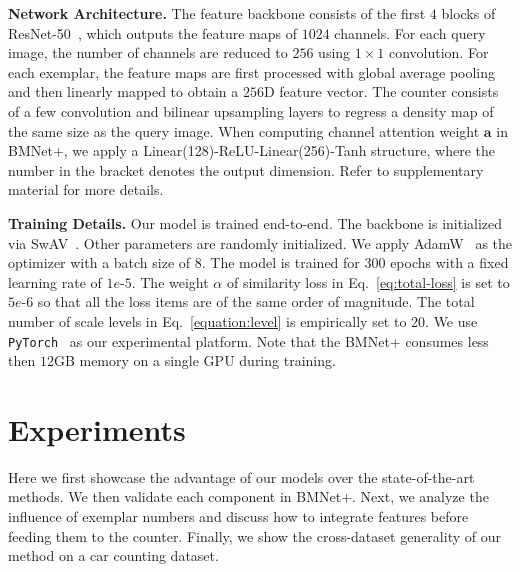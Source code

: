 \documentclass[10pt,twocolumn,letterpaper]{article}
\newcommand{\margin}{\vspace{3pt}\noindent}
\begin{document}
\margin
\textbf{Network Architecture.}
The feature backbone consists of the first $4$ blocks of ResNet-50~\cite{resnet}, which outputs the feature maps of $1024$ channels. For each query image, the number of channels are reduced to $256$ using $1 \times 1$ convolution. For each exemplar, the feature maps are first processed with global average pooling and then linearly mapped to obtain a $256$D feature vector. The counter consists of a few convolution and bilinear upsampling layers to regress a density map of the same size as the query image. When computing channel attention weight $\boldsymbol{a}$ in BMNet+, we apply a Linear(128)-ReLU-Linear(256)-Tanh structure, where the number in the bracket denotes the output dimension. Refer to supplementary material for more details.

\margin
\textbf{Training Details.}
Our model is trained end-to-end. The backbone is initialized via SwAV~\cite{swav}. Other parameters are randomly initialized. We apply AdamW~\cite{adamw} as the optimizer with a batch size of $8$. The model is trained for $300$ epochs with a fixed learning rate of $1e$-$5$. The weight $\alpha$ of similarity loss in Eq.~\ref{eq:total-loss} is set to $5e$-$6$ so that all the loss items are of the same order of magnitude. The total number of scale levels in Eq.~\ref{equation:level} is empirically set to $20$. We use \texttt{PyTorch}~\cite{paszke2019pytorch} as our experimental platform. Note that the BMNet+ consumes less then $12$GB memory on a single GPU during training. 


\section{Experiments}
\label{exp:all}
Here we first showcase the advantage of our models over the state-of-the-art methods. We then validate each component in BMNet+. Next, we analyze the influence of exemplar numbers and discuss how to integrate features before feeding them to the counter. Finally, we show the cross-dataset generality of our method on a car counting dataset.
\end{document}
